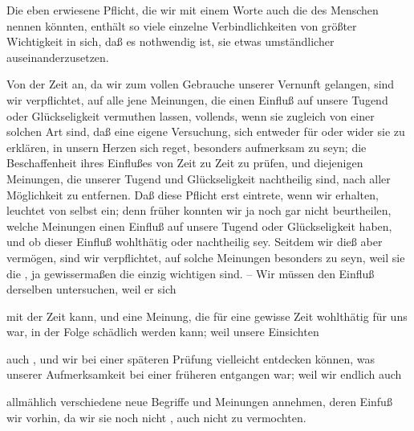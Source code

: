 Die eben erwiesene Pflicht, die wir mit einem Worte auch die  des Menschen nennen könnten, enthält so viele einzelne Verbindlichkeiten von größter Wichtigkeit in sich, daß es nothwendig ist, sie etwas umständlicher auseinanderzusetzen.
\begin{aufza} 
\item Von der Zeit an, da wir zum vollen Gebrauche unserer Vernunft gelangen, sind wir verpflichtet, auf alle jene Meinungen, die einen Einfluß auf unsere Tugend oder Glückseligkeit vermuthen lassen, vollends, wenn sie zugleich von einer solchen Art sind, daß eine eigene Versuchung, sich entweder für oder wider sie zu erklären, in unsern Herzen sich reget, besonders aufmerksam zu seyn; die Beschaffenheit ihres Einflußes von Zeit zu Zeit zu prüfen, und diejenigen Meinungen, die unserer Tugend und Glückseligkeit nachtheilig sind, nach aller Möglichkeit zu entfernen. Daß diese Pflicht erst eintrete, wenn wir  erhalten, leuchtet von selbst ein; denn früher konnten wir ja noch gar nicht beurtheilen, welche Meinungen einen Einfluß auf unsere Tugend oder Glückseligkeit haben, und ob dieser Einfluß wohlthätig oder nachtheilig sey. Seitdem wir dieß aber vermögen, sind wir verpflichtet, auf solche Meinungen besonders  zu seyn, weil sie die , ja gewissermaßen die einzig wichtigen sind. -- Wir müssen den Einfluß derselben   untersuchen, weil er sich
\begin{aufzb} 
\item mit der Zeit  kann, und eine Meinung, die für eine gewisse Zeit wohlthätig für uns war, in der Folge schädlich werden kann; weil unsere Einsichten~
\item auch , und wir bei einer späteren Prüfung vielleicht entdecken können, was unserer Aufmerksamkeit bei einer früheren entgangen war; weil wir endlich auch
\item allmählich verschiedene neue Begriffe und Meinungen annehmen, deren Einfuß wir vorhin, da wir sie noch nicht , auch nicht zu  vermochten.
\end{aufzb}

\end{aufza}

